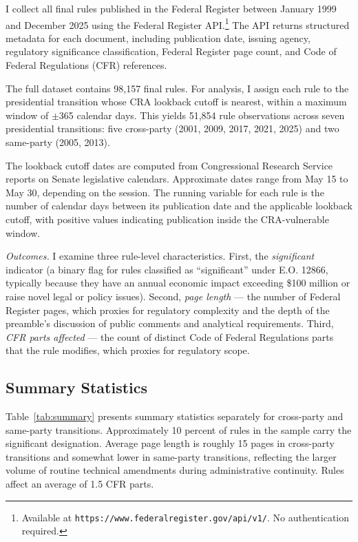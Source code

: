 \documentclass[12pt]{article}
\begin{document}
I collect all final rules published in the Federal Register between January 1999 and December 2025 using the Federal Register API.\footnote{Available at \texttt{https://www.federalregister.gov/api/v1/}. No authentication required.} The API returns structured metadata for each document, including publication date, issuing agency, regulatory significance classification, Federal Register page count, and Code of Federal Regulations (CFR) references.

The full dataset contains 98,157 final rules. For analysis, I assign each rule to the presidential transition whose CRA lookback cutoff is nearest, within a maximum window of $\pm$365 calendar days. This yields 51,854 rule observations across seven presidential transitions: five cross-party (2001, 2009, 2017, 2021, 2025) and two same-party (2005, 2013).

The lookback cutoff dates are computed from Congressional Research Service reports on Senate legislative calendars. Approximate dates range from May 15 to May 30, depending on the session. The running variable for each rule is the number of calendar days between its publication date and the applicable lookback cutoff, with positive values indicating publication inside the CRA-vulnerable window.

\textit{Outcomes.} I examine three rule-level characteristics. First, the \textit{significant} indicator (a binary flag for rules classified as ``significant'' under E.O. 12866, typically because they have an annual economic impact exceeding \$100 million or raise novel legal or policy issues). Second, \textit{page length} --- the number of Federal Register pages, which proxies for regulatory complexity and the depth of the preamble's discussion of public comments and analytical requirements. Third, \textit{CFR parts affected} --- the count of distinct Code of Federal Regulations parts that the rule modifies, which proxies for regulatory scope.

\subsection{Summary Statistics}



Table~\ref{tab:summary} presents summary statistics separately for cross-party and same-party transitions. Approximately 10 percent of rules in the sample carry the significant designation. Average page length is roughly 15 pages in cross-party transitions and somewhat lower in same-party transitions, reflecting the larger volume of routine technical amendments during administrative continuity. Rules affect an average of 1.5 CFR parts.
\end{document}
